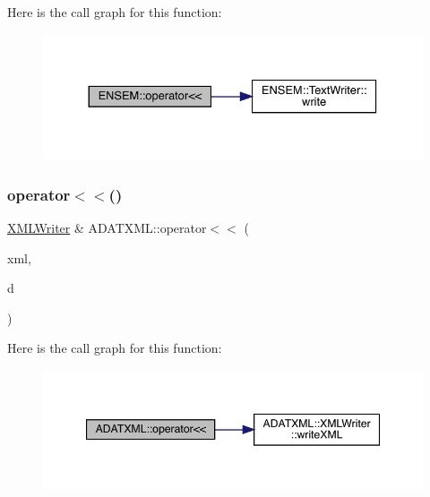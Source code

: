 Here is the call graph for this function\+:\nopagebreak
\begin{figure}[H]
\begin{center}
\leavevmode
\includegraphics[width=330pt]{d2/da3/group__io_ga4bb4e9f2c0da52dbce22280b6b00e35d_cgraph}
\end{center}
\end{figure}
\mbox{\label{group__io_gaeedb0da293eebaa00dff464efbb18eab}} 
\subsubsection{\texorpdfstring{operator$<$$<$()}{operator<<()}\hspace{0.1cm}{\footnotesize\ttfamily [13/26]}}
{\footnotesize\ttfamily \mbox{\hyperlink{classADATXML_1_1XMLWriter}{X\+M\+L\+Writer}} \& A\+D\+A\+T\+X\+M\+L\+::operator$<$$<$ (\begin{DoxyParamCaption}\item[{\mbox{\hyperlink{classADATXML_1_1XMLWriter}{X\+M\+L\+Writer}} \&}]{xml,  }\item[{const \mbox{\hyperlink{classADATXML_1_1XMLReader}{X\+M\+L\+Reader}} \&}]{d }\end{DoxyParamCaption})}

Here is the call graph for this function\+:\nopagebreak
\begin{figure}[H]
\begin{center}
\leavevmode
\includegraphics[width=347pt]{d2/da3/group__io_gaeedb0da293eebaa00dff464efbb18eab_cgraph}
\end{center}
\end{figure}
\mbox{\label{group__io_ga5f6c03929b05296b731cf36fb65cf9c6}} 
